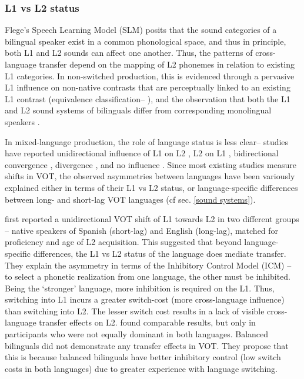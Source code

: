 \documentclass[charis,linguex]{glossa}
\begin{document}
\subsubsection{L1 vs L2 status} 
Flege's Speech Learning Model (SLM) \citeyear{flege1995second,flege2007language} posits that the sound categories of a bilingual speaker exist in a common phonological space, and thus in principle, both L1 and L2 sounds can affect one another. Thus, the patterns of cross-language transfer depend on the mapping of L2 phonemes in relation to existing L1 categories. In non-switched production, this is evidenced through a pervasive L1 influence on non-native contrasts that are perceptually linked to an existing L1 contrast (equivalence classification-- \cite{flege1984limits,flege1987production}), and
the observation that both the L1 and L2 sound systems of bilinguals differ from corresponding monolingual speakers \citep{guion2003vowel}. 

In mixed-language production, the role of language status is less clear-- studies have reported unidirectional influence of L1 on L2 \citep{balukas2015spanish,antoniou2011inter,vsimavckova2015immediate,goldrick2014language}, L2 on L1 \citep{tsui2019impact,elias2017effects, olson2013bilingual}, bidirectional convergence \citep{bullock2009trying, olson2016role}, divergence \citep{bullock2009trying,vsimavckova2018patterns}, and no influence \citep{muldner2019phonetics,schwartz2015language}. Since most existing studies measure shifts in VOT, the observed asymmetries between languages have been variously explained either in terms of their L1 vs L2 status, or language-specific differences between long- and short-lag VOT languages (cf sec. \ref{sound systems}).

\cite{olson2013bilingual} first reported a unidirectional VOT shift of L1 towards L2 in two different groups -- native speakers of Spanish (short-lag) and English (long-lag), matched for proficiency and age of L2 acquisition. This suggested that beyond language-specific differences, the L1 vs L2 status of the language does mediate transfer. They explain the asymmetry in terms of the Inhibitory Control Model (ICM) \citep{green1998mental} -- to select a phonetic realization from one language, the other must be inhibited. Being the `stronger' language, more inhibition is required on the L1. Thus, switching into L1 incurs a greater switch-cost (more cross-language influence) than switching into L2. The lesser switch cost results in a lack of visible cross-language transfer effects on L2. \cite{tsui2019impact} found comparable results, but only in participants who were not equally dominant in both languages. Balanced bilinguals did not demonstrate any transfer effects in VOT. They propose that this is because balanced bilinguals have better inhibitory control (low switch costs in both languages) due to greater experience with language switching.
\end{document}
